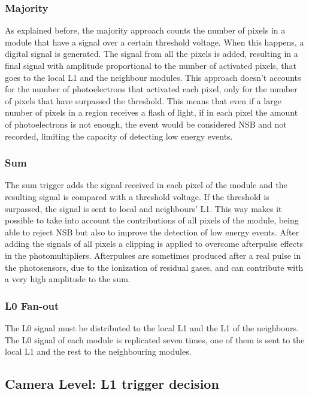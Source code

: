 \documentclass[a4paper,10pt]{book}
\begin{document}
\subsubsection{Majority}

As explained before, the majority approach counts the number of pixels in a module that have a signal over a certain threshold voltage. 
When this happens, a digital signal is generated. The signal from all the pixels is added, resulting in a final signal with amplitude 
proportional to the number of activated pixels, that goes to the local L1 and the neighbour modules. This approach doesn't accounts for the number of photoelectrons that activated each pixel,
only for the number of pixels that have surpassed the threshold. This means that even if a large number of pixels in a region receives
a flash of light, if in each pixel the amount of photoelectrons is not enough, the event would be considered NSB and not recorded,
limiting the capacity of detecting low energy events. 

\subsubsection{Sum}

The sum trigger adds the signal received in each pixel of the module and the resulting signal is compared with a threshold voltage. If 
the threshold is surpassed, the signal is sent to local and neighbours' L1. This way makes it possible to take into account the contributions
of all pixels of the module, being able to reject NSB but also to improve the detection of low energy events. After adding the signals
of all pixels a clipping is applied to overcome afterpulse effects in the photomultipliers. Afterpulses are sometimes produced after a real pulse
in the photosensors, due to the ionization of residual gases, and can contribute with a very high amplitude to the sum. 

\subsubsection{L0 Fan-out}

The L0 signal must be distributed to the local L1 and the L1 of the neighbours. The L0 signal of each module is replicated seven times, 
one of them is sent to the local L1 and the rest to the neighbouring modules. 

\subsection{Camera Level: L1 trigger decision}
\end{document}
